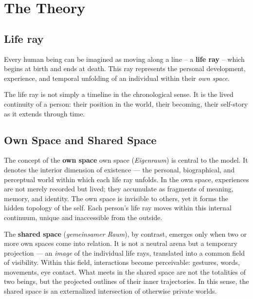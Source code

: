 \section{The Theory}

\subsection{Life ray}

Every human being can be imagined as moving along a line -- a \textbf{life ray} -- which begins at birth and ends at death.
This ray represents the personal development, experience, and temporal unfolding of an individual within their \textit{own space}.

The life ray is not simply a timeline in the chronological sense.
It is the lived continuity of a person: their position in the world, their becoming, their self-story as it extends through time.

\subsection{Own Space and Shared Space}

The concept of the \textbf{own space}
own space (\textit{Eigenraum}) is central to the model.
It denotes the interior dimension of existence — the personal, biographical, and perceptual world within which each life ray unfolds.
In the own space, experiences are not merely recorded but lived; they accumulate as fragments of meaning, memory, and identity.
The own space is invisible to others, yet it forms the hidden topology of the self.
Each person’s life ray moves within this internal continuum, unique and inaccessible from the outside.

The \textbf{shared space} (\textit{gemeinsamer Raum}),
by contrast, emerges only when two or more own spaces come into relation.
It is not a neutral arena but a temporary projection — an \textit{image} of the individual life rays, translated into a common field of visibility.
Within this field, interactions become perceivable: gestures, words, movements, eye contact.
What meets in the shared space are not the totalities of two beings, but the projected outlines of their inner trajectories.
In this sense, the shared space is an externalized intersection of otherwise private worlds.

